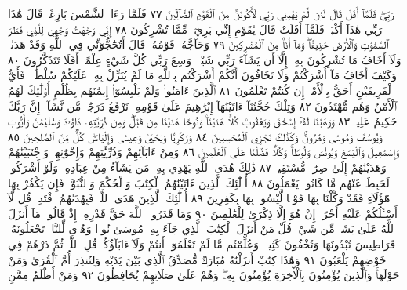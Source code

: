 رَبِّيۖ فَلَمَّآ أَفَلَ قَالَ لَئِن لَّمْ يَهْدِنِي رَبِّي لَأَكُونَنَّ مِنَ ٱلْقَوْمِ
ٱلضَّآلِّينَ ٧٧ فَلَمَّا رَءَا ٱلشَّمْسَ بَازِغَةࣰ قَالَ هَٰذَا رَبِّي هَٰذَآ
أَكْبَرُۖ فَلَمَّآ أَفَلَتْ قَالَ يَٰقَوْمِ إِنِّي بَرِيٓءࣱ مِّمَّا تُشْرِكُونَ ٧٨
إِنِّي وَجَّهْتُ وَجْهِيَ لِلَّذِي فَطَرَ ٱلسَّمَٰوَٰتِ وَٱلْأَرْضَ
حَنِيفࣰاۖ وَمَآ أَنَا۠ مِنَ ٱلْمُشْرِكِينَ ٧٩ وَحَآجَّهُۥ قَوْمُهُۥۚ قَالَ
أَتُحَٰٓجُّوٓنِّي فِي ٱللَّهِ وَقَدْ هَدَىٰنِۚ وَلَآ أَخَافُ مَا تُشْرِكُونَ بِهِۦٓ
إِلَّآ أَن يَشَآءَ رَبِّي شَيْـࣰٔاۚ وَسِعَ رَبِّي كُلَّ شَيْءٍ عِلْمًاۚ أَفَلَا
تَتَذَكَّرُونَ ٨٠ وَكَيْفَ أَخَافُ مَآ أَشْرَكْتُمْ وَلَا تَخَافُونَ
أَنَّكُمْ أَشْرَكْتُم بِٱللَّهِ مَا لَمْ يُنَزِّلْ بِهِۦ عَلَيْكُمْ سُلْطَٰنࣰاۚ
فَأَيُّ ٱلْفَرِيقَيْنِ أَحَقُّ بِٱلْأَمْنِۖ إِن كُنتُمْ تَعْلَمُونَ ٨١
ٱلَّذِينَ ءَامَنُوا۟ وَلَمْ يَلْبِسُوٓا۟ إِيمَٰنَهُم بِظُلْمٍ أُو۟لَٰٓئِكَ لَهُمُ ٱلْأَمْنُ
وَهُم مُّهْتَدُونَ ٨٢ وَتِلْكَ حُجَّتُنَآ ءَاتَيْنَٰهَآ إِبْرَٰهِيمَ عَلَىٰ
قَوْمِهِۦۚ نَرْفَعُ دَرَجَٰتࣲ مَّن نَّشَآءُۗ إِنَّ رَبَّكَ حَكِيمٌ عَلِيمࣱ ٨٣
وَوَهَبْنَا لَهُۥٓ إِسْحَٰقَ وَيَعْقُوبَۚ كُلًّا هَدَيْنَاۚ وَنُوحًا هَدَيْنَا
مِن قَبْلُۖ وَمِن ذُرِّيَّتِهِۦ دَاوُۥدَ وَسُلَيْمَٰنَ وَأَيُّوبَ وَيُوسُفَ
وَمُوسَىٰ وَهَٰرُونَۚ وَكَذَٰلِكَ نَجْزِي ٱلْمُحْسِنِينَ ٨٤
وَزَكَرِيَّا وَيَحْيَىٰ وَعِيسَىٰ وَإِلْيَاسَۖ كُلࣱّ مِّنَ ٱلصَّٰلِحِينَ ٨٥
وَإِسْمَٰعِيلَ وَٱلْيَسَعَ وَيُونُسَ وَلُوطࣰاۚ وَكُلࣰّا فَضَّلْنَا عَلَى
ٱلْعَٰلَمِينَ ٨٦ وَمِنْ ءَابَآئِهِمْ وَذُرِّيَّٰتِهِمْ وَإِخْوَٰنِهِمْۖ وَٱجْتَبَيْنَٰهُمْ
وَهَدَيْنَٰهُمْ إِلَىٰ صِرَٰطࣲ مُّسْتَقِيمࣲ ٨٧ ذَٰلِكَ هُدَى ٱللَّهِ يَهْدِي
بِهِۦ مَن يَشَآءُ مِنْ عِبَادِهِۦۚ وَلَوْ أَشْرَكُوا۟ لَحَبِطَ عَنْهُم مَّا كَانُوا۟
يَعْمَلُونَ ٨٨ أُو۟لَٰٓئِكَ ٱلَّذِينَ ءَاتَيْنَٰهُمُ ٱلْكِتَٰبَ وَٱلْحُكْمَ
وَٱلنُّبُوَّةَۚ فَإِن يَكْفُرْ بِهَا هَٰٓؤُلَآءِ فَقَدْ وَكَّلْنَا بِهَا قَوْمࣰا لَّيْسُوا۟
بِهَا بِكَٰفِرِينَ ٨٩ أُو۟لَٰٓئِكَ ٱلَّذِينَ هَدَى ٱللَّهُۖ فَبِهُدَىٰهُمُ ٱقْتَدِهْۗ
قُل لَّآ أَسْـَٔلُكُمْ عَلَيْهِ أَجْرًاۖ إِنْ هُوَ إِلَّا ذِكْرَىٰ لِلْعَٰلَمِينَ ٩٠
وَمَا قَدَرُوا۟ ٱللَّهَ حَقَّ قَدْرِهِۦٓ إِذْ قَالُوا۟ مَآ أَنزَلَ ٱللَّهُ عَلَىٰ بَشَرࣲ مِّن شَيْءࣲۗ
قُلْ مَنْ أَنزَلَ ٱلْكِتَٰبَ ٱلَّذِي جَآءَ بِهِۦ مُوسَىٰ نُورࣰا وَهُدࣰى
لِّلنَّاسِۖ تَجْعَلُونَهُۥ قَرَاطِيسَ تُبْدُونَهَا وَتُخْفُونَ كَثِيرࣰاۖ وَعُلِّمْتُم
مَّا لَمْ تَعْلَمُوٓا۟ أَنتُمْ وَلَآ ءَابَآؤُكُمْۖ قُلِ ٱللَّهُۖ ثُمَّ ذَرْهُمْ فِي خَوْضِهِمْ
يَلْعَبُونَ ٩١ وَهَٰذَا كِتَٰبٌ أَنزَلْنَٰهُ مُبَارَكࣱ مُّصَدِّقُ ٱلَّذِي بَيْنَ
يَدَيْهِ وَلِتُنذِرَ أُمَّ ٱلْقُرَىٰ وَمَنْ حَوْلَهَاۚ وَٱلَّذِينَ يُؤْمِنُونَ بِٱلْأٓخِرَةِ
يُؤْمِنُونَ بِهِۦۖ وَهُمْ عَلَىٰ صَلَاتِهِمْ يُحَافِظُونَ ٩٢ وَمَنْ أَظْلَمُ مِمَّنِ
